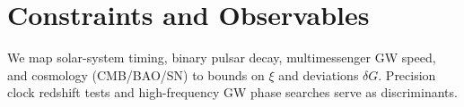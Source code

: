 
\section{Constraints and Observables}\label{sec:experiments}
We map solar-system timing, binary pulsar decay, multimessenger GW speed, and cosmology (CMB/BAO/SN) to bounds on $\xi$ and deviations $\delta G$. Precision clock redshift tests and high-frequency GW phase searches serve as discriminants.
